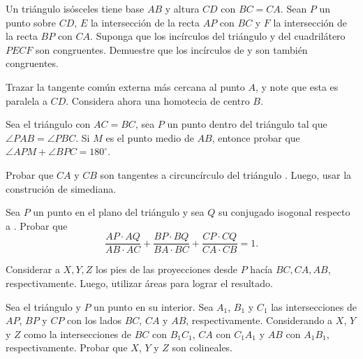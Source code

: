 \begin{section-problem}
    Un triángulo isósceles  tiene base $AB$ y altura $CD$ con $BC = CA$.
    Sean $P$ un punto sobre $CD$, $E$ la intersección de la recta $AP$ con $BC$ y $F$ la intersección de la recta $BP$ con $CA$.
    Suponga que los incírculos del triángulo  y del cuadrilátero $PECF$ son congruentes.
    Demuestre que los incírculos de  y  son también congruentes.
\end{section-problem}

\begin{hint}
    Trazar la tangente común externa más cercana al punto $A$, y note que esta es paralela a $CD$.
    Considera ahora una homotecia de centro $B$.
\end{hint}


\begin{section-problem}
    Sea el triángulo  con $AC = BC$, sea $P$ un punto dentro del triángulo tal que $\angle PAB = \angle PBC$.
    Si $M$ es el punto medio de $AB$, entonce probar que $\angle APM + \angle BPC = 180^{\circ}$.
\end{section-problem}

\begin{hint}
    Probar que $CA$ y $CB$ son tangentes a circuncírculo del triángulo .
    Luego, usar la construción de simediana.
\end{hint}



\begin{section-problem}
    Sea $P$ un punto en el plano del triángulo  y sea $Q$ su conjugado isogonal respecto a .
    Probar que
    \[
        \frac{AP \cdot AQ}{AB \cdot AC} + \frac{BP \cdot BQ}{BA \cdot BC} + \frac{CP \cdot CQ}{CA \cdot CB} = 1.
    \]
\end{section-problem}

\begin{hint}
    Considerar a $X, Y, Z$ los pies de las proyecciones desde $P$ hacía $BC, CA, AB$, respectivamente.
    Luego, utilizar áreas para lograr el resultado.
\end{hint}


\begin{section-problem}
    Sea el triángulo  y $P$ un punto en su interior.
    Sea $A_1$, $B_1$ y $C_1$ las intersecciones de $AP$, $BP$ y $CP$ con los lados $BC$, $CA$ y $AB$, respectivamente.
    Considerando a $X$, $Y$ y $Z$ como la intersecciones de $BC$ con $B_1 C_1$, $CA$ con $C_1 A_1$ y $AB$ con $A_1 B_1$, respectivamente.
    Probar que $X$, $Y$ y $Z$ son colineales.
\end{section-problem}

